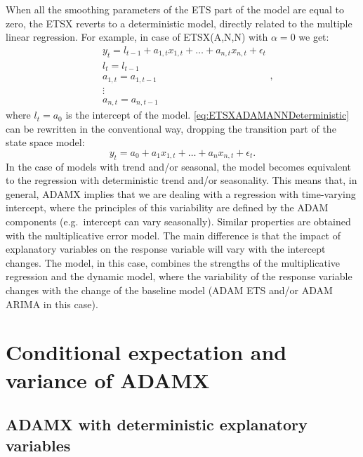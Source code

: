 \documentclass[
]{book}
\theoremstyle{definition}
\theoremstyle{definition}
\theoremstyle{definition}
\theoremstyle{definition}
\theoremstyle{remark}
\begin{document}
When all the smoothing parameters of the ETS part of the model are equal to zero, the ETSX reverts to a deterministic model, directly related to the multiple linear regression. For example, in case of ETSX(A,N,N) with \(\alpha=0\) we get:
\begin{equation}
  \begin{aligned}
    & y_{t} = l_{t-1} + a_{1,t} x_{1,t} + \dots + a_{n,t} x_{n,t} + \epsilon_t \\
    & l_t = l_{t-1} \\
    & a_{1,t} = a_{1,t-1} \\
    & \vdots \\
    & a_{n,t} = a_{n,t-1}
  \end{aligned},
  \label{eq:ETSXADAMANNDeterministic}
\end{equation}
where \(l_t=a_0\) is the intercept of the model. \eqref{eq:ETSXADAMANNDeterministic} can be rewritten in the conventional way, dropping the transition part of the state space model:
\begin{equation}
    y_{t} = a_0 + a_{1} x_{1,t} + \dots + a_{n} x_{n,t} + \epsilon_t .
  \label{eq:linearRegression}
\end{equation}
In the case of models with trend and/or seasonal, the model becomes equivalent to the regression with deterministic trend and/or seasonality. This means that, in general, ADAMX implies that we are dealing with a regression with time-varying intercept, where the principles of this variability are defined by the ADAM components (e.g.~intercept can vary seasonally). Similar properties are obtained with the multiplicative error model. The main difference is that the impact of explanatory variables on the response variable will vary with the intercept changes. The model, in this case, combines the strengths of the multiplicative regression and the dynamic model, where the variability of the response variable changes with the change of the baseline model (ADAM ETS and/or ADAM ARIMA in this case).

\hypertarget{ADAMXConventionalConditionalMoments}{%
\section{Conditional expectation and variance of ADAMX}\label{ADAMXConventionalConditionalMoments}}

\hypertarget{adamx-with-deterministic-explanatory-variables}{%
\subsection{ADAMX with deterministic explanatory variables}\label{adamx-with-deterministic-explanatory-variables}}
\end{document}
